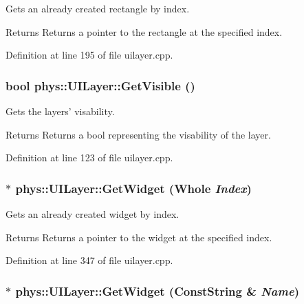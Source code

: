 Gets an already created rectangle by index. 

\begin{DoxyReturn}{Returns}
Returns a pointer to the rectangle at the specified index. 
\end{DoxyReturn}


Definition at line 195 of file uilayer.cpp.

\hypertarget{classphys_1_1UILayer_a2d4aaa7627339d7139d7a453ccf55ade}{
\subsubsection[{GetVisible}]{\setlength{\rightskip}{0pt plus 5cm}bool phys::UILayer::GetVisible ()}}
\label{da/d48/classphys_1_1UILayer_a2d4aaa7627339d7139d7a453ccf55ade}


Gets the layers' visability. 

\begin{DoxyReturn}{Returns}
Returns a bool representing the visability of the layer. 
\end{DoxyReturn}


Definition at line 123 of file uilayer.cpp.

\hypertarget{classphys_1_1UILayer_ab16bb514422f10dab03dca0a6f269a66}{
\subsubsection[{GetWidget}]{ $\ast$ phys::UILayer::GetWidget ({\bf Whole} {\em Index})}}
\label{da/d48/classphys_1_1UILayer_ab16bb514422f10dab03dca0a6f269a66}


Gets an already created widget by index. 

\begin{DoxyReturn}{Returns}
Returns a pointer to the widget at the specified index. 
\end{DoxyReturn}


Definition at line 347 of file uilayer.cpp.

\hypertarget{classphys_1_1UILayer_afcc3fd6ff5d0731aa57f1012deea7214}{
\subsubsection[{GetWidget}]{ $\ast$ phys::UILayer::GetWidget ({\bf ConstString} \& {\em Name})}}
\label{da/d48/classphys_1_1UILayer_afcc3fd6ff5d0731aa57f1012deea7214}


